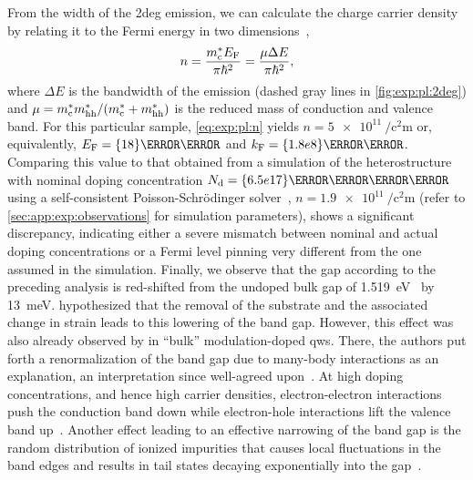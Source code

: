 From the width of the \gls{2deg} emission, we can calculate the charge carrier density by relating it to the Fermi energy in two dimensions~\cite{Pinczuk1984,Ihn2009},
\begin{equation}\label{eq:exp:pl:n}
    n = \frac{m^{\ast}_{\mathrm{c}}E_{\mathrm{F}}}{\pi\hbar^2} = \frac{\mu\Delta E}{\pi\hbar^2},
\end{equation}
where $\Delta E$ is the bandwidth of the emission (dashed gray lines in \cref{fig:exp:pl:2deg}) and $\mu = m^{\ast}_{\mathrm{c}}m^{\ast}_{\mathrm{hh}}/(m^{\ast}_{\mathrm{c}} + m^{\ast}_{\mathrm{hh}})$ is the reduced mass of conduction and valence band.
For this particular sample, \cref{eq:exp:pl:n} yields $n = \qty{5e11}{\per\square\centi\meter}$ or, equivalently, $E_{\mr{F}} = \qty{18}{\milli\electronvolt}$ and $k_{\mr{F}} = \qty{1.8e8}{\per\meter}$.
Comparing this value to that obtained from a simulation of the heterostructure with nominal doping concentration $N_{\mr{d}} = \qty{6.5e17}{\per\cubic\centi\meter}$ using a self-consistent Poisson-Schrödinger solver~\cite{PoissonSchroedinger}, $n = \qty{1.9e11}{\per\square\centi\meter}$ (refer to \cref{sec:app:exp:observations} for simulation parameters), shows a significant discrepancy, indicating either a severe mismatch between nominal and actual doping concentrations or a Fermi level pinning very different from the one assumed in the simulation.
Finally, we observe that the gap according to the preceding analysis is red-shifted from the undoped bulk gap of \qty{1.519}{\electronvolt}~\cite{Vurgaftman2001} by \qty{13}{\milli\electronvolt}.
\textcite{Descamps2021} hypothesized that the removal of the  substrate and the associated change in strain leads to this lowering of the band gap.
However, this effect was also already observed by \textcite{Pinczuk1984} in \enquote{bulk} modulation-doped  \glspl{qw}.
There, the authors put forth a renormalization of the band gap due to many-body interactions as an explanation, an interpretation since well-agreed upon~\cite{Jain1992}.
At high doping concentrations, and hence high carrier densities, electron-electron interactions push the conduction band down while electron-hole interactions lift the valence band up~\cite{Jain1987}.
Another effect leading to an effective narrowing of the band gap is the random distribution of ionized impurities that causes local fluctuations in the band edges and results in tail states decaying exponentially into the gap~\cite{Jain1987}.

